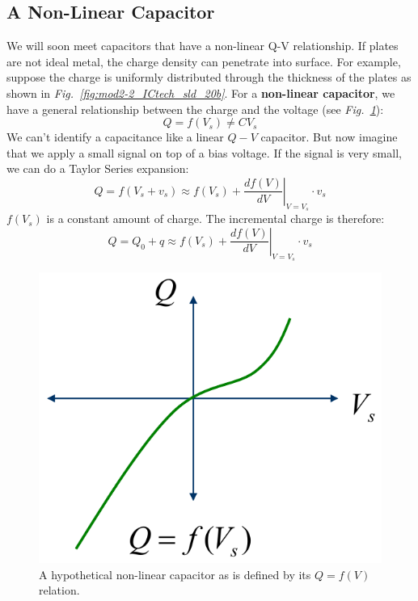 \subsection{A Non-Linear Capacitor}
We will soon meet capacitors that have a non-linear Q-V relationship.  If plates are not ideal metal, the charge density can penetrate into surface.  For example, suppose the charge is uniformly distributed through the thickness of the plates as shown in \emph{Fig.~\ref{fig:mod2-2_ICtech_sld_20b}}.
For a \textbf{non-linear capacitor}, we have a general relationship between the charge and the voltage (see \emph{Fig.~\ref{fig:mod2-2_ICtech_sld_20}}):
    \begin{equation} 
        Q = f({V_s}) \ne C{V_s} 
    \end{equation}
We can’t identify a capacitance like a linear $Q-V$ capacitor.  But now imagine that we apply a small signal on top of a bias voltage.  If the signal is very small, we can do a Taylor Series expansion:
    \begin{equation} 
        Q = f({V_s} + {v_s}) \approx f({V_s}) + {\left. {\frac{{df(V)}}{{dV}}} \right|_{V = {V_s}}} \cdot {v_s} 
    \end{equation}
$f(V_s)$ is a constant amount of charge.  The incremental charge is therefore:
    \begin{equation} 
        Q = {Q_0} + q \approx f({V_s}) + {\left. {\frac{{df(V)}}{{dV}}} \right|_{V = {V_s}}} \cdot {v_s}
    \end{equation}
\begin{figure}[tb]
\centering
\includegraphics[width=.35\columnwidth]{mod2-2_ICtech_sld_20} 
\caption{A hypothetical non-linear capacitor as is defined by its $Q = f(V)$ relation.} \label{fig:mod2-2_ICtech_sld_20}
\end{figure}
